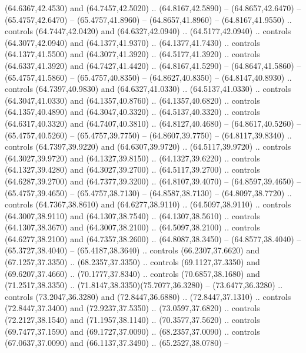 \begin{scope}[cm={{1.25,0.0,0.0,-1.25,(-71.74049,81.13304)}}]
        (64.6367,42.4530) and (64.7457,42.5020) .. (64.8167,42.5890) --
        (64.8657,42.6470) -- (65.4757,42.6470) -- (65.4757,41.8960) --
        (64.8657,41.8960) -- (64.8167,41.9550) .. controls (64.7447,42.0420) and
        (64.6327,42.0940) .. (64.5177,42.0940) .. controls (64.3077,42.0940) and
        (64.1377,41.9370) .. (64.1377,41.7430) .. controls (64.1377,41.5500) and
        (64.3077,41.3920) .. (64.5177,41.3920) .. controls (64.6337,41.3920) and
        (64.7427,41.4420) .. (64.8167,41.5290) -- (64.8647,41.5860) --
        (65.4757,41.5860) -- (65.4757,40.8350) -- (64.8627,40.8350) --
        (64.8147,40.8930) .. controls (64.7397,40.9830) and (64.6327,41.0330) ..
        (64.5137,41.0330) .. controls (64.3047,41.0330) and (64.1357,40.8760) ..
        (64.1357,40.6820) .. controls (64.1357,40.4890) and (64.3047,40.3320) ..
        (64.5137,40.3320) .. controls (64.6317,40.3320) and (64.7407,40.3810) ..
        (64.8127,40.4680) -- (64.8617,40.5260) -- (65.4757,40.5260) --
        (65.4757,39.7750) -- (64.8607,39.7750) -- (64.8117,39.8340) .. controls
        (64.7397,39.9220) and (64.6307,39.9720) .. (64.5117,39.9720) .. controls
        (64.3027,39.9720) and (64.1327,39.8150) .. (64.1327,39.6220) .. controls
        (64.1327,39.4280) and (64.3027,39.2700) .. (64.5117,39.2700) .. controls
        (64.6287,39.2700) and (64.7377,39.3200) .. (64.8107,39.4070) --
        (64.8597,39.4650) -- (65.4757,39.4650) -- (65.4757,38.7130) --
        (64.8587,38.7130) -- (64.8097,38.7720) .. controls (64.7367,38.8610) and
        (64.6277,38.9110) .. (64.5097,38.9110) .. controls (64.3007,38.9110) and
        (64.1307,38.7540) .. (64.1307,38.5610) .. controls (64.1307,38.3670) and
        (64.3007,38.2100) .. (64.5097,38.2100) .. controls (64.6277,38.2100) and
        (64.7357,38.2600) .. (64.8087,38.3450) -- (64.8577,38.4040) --
        (65.3727,38.4040) -- (65.4187,38.3640) .. controls (66.2307,37.6620) and
        (67.1257,37.3350) .. (68.2357,37.3350) .. controls (69.1127,37.3350) and
        (69.6207,37.4660) .. (70.1777,37.8340) .. controls (70.6857,38.1680) and
        (71.2517,38.3350) .. (71.8147,38.3350)(75.7077,36.3280) -- (73.6477,36.3280)
        .. controls (73.2047,36.3280) and (72.8447,36.6880) .. (72.8447,37.1310) ..
        controls (72.8447,37.3400) and (72.9237,37.5350) .. (73.0597,37.6820) ..
        controls (72.2127,38.1540) and (71.1957,38.1140) .. (70.3577,37.5620) ..
        controls (69.7477,37.1590) and (69.1727,37.0090) .. (68.2357,37.0090) ..
        controls (67.0637,37.0090) and (66.1137,37.3490) .. (65.2527,38.0780) --

\end{scope}
